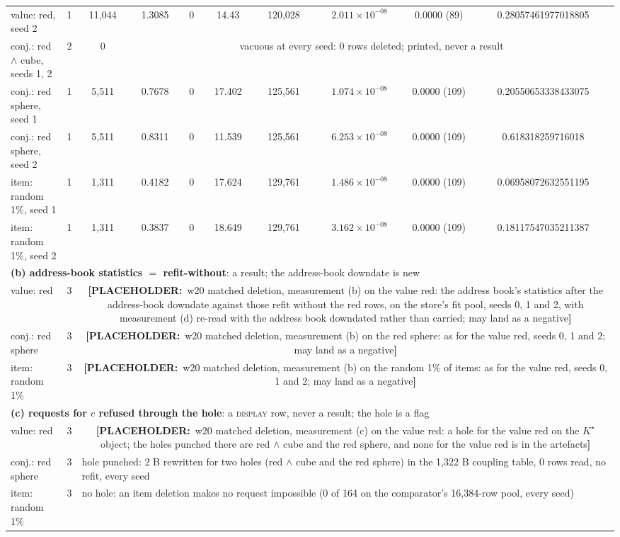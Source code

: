 \documentclass{article} %
\newcommand{\PLACEHOLDER}[1]{{\color{red}\textbf{[PLACEHOLDER:}~#1\textbf{]}}}
\newcommand{\sci}[2]{\ensuremath{#1\times10^{#2}}}
\newcommand{\Kstar}{\ensuremath{K^{\star}}}
\begin{document}
\begin{table}[t]
\begin{adjustbox}{max width=\linewidth}
\begin{tabular}{lccccccccc}
value: red, seed 2 & 1 & 11,044 & 1.3085 & 0 & 14.43 & 120,028 & \sci{2.011}{-08} & 0.0000 (89) & 0.28057461977018805 \\
conj.: red $\wedge$ cube, seeds 1, 2 & 2 & 0 & \multicolumn{7}{c}{vacuous at every seed: 0 rows deleted; printed, never a result} \\
conj.: red sphere, seed 1 & 1 & 5,511 & 0.7678 & 0 & 17.402 & 125,561 & \sci{1.074}{-08} & 0.0000 (109) & 0.20550653338433075 \\
conj.: red sphere, seed 2 & 1 & 5,511 & 0.8311 & 0 & 11.539 & 125,561 & \sci{6.253}{-08} & 0.0000 (109) & 0.618318259716018 \\
item: random 1\%, seed 1 & 1 & 1,311 & 0.4182 & 0 & 17.624 & 129,761 & \sci{1.486}{-08} & 0.0000 (109) & 0.06958072632551195 \\
item: random 1\%, seed 2 & 1 & 1,311 & 0.3837 & 0 & 18.649 & 129,761 & \sci{3.162}{-08} & 0.0000 (109) & 0.18117547035211387 \\
\midrule
\multicolumn{10}{l}{\textbf{(b) address-book statistics $=$ refit-without}: a result; the address-book downdate is new} \\
value: red & 3 & \multicolumn{8}{p{12cm}}{\PLACEHOLDER{w20 matched deletion, measurement (b) on the value red: the address book's statistics after the address-book downdate against those refit without the red rows, on the store's fit pool, seeds 0, 1 and 2, with measurement (d) re-read with the address book downdated rather than carried; may land as a negative}} \\
conj.: red sphere & 3 & \multicolumn{8}{p{12cm}}{\PLACEHOLDER{w20 matched deletion, measurement (b) on the red sphere: as for the value red, seeds 0, 1 and 2; may land as a negative}} \\
item: random 1\% & 3 & \multicolumn{8}{p{12cm}}{\PLACEHOLDER{w20 matched deletion, measurement (b) on the random 1\% of items: as for the value red, seeds 0, 1 and 2; may land as a negative}} \\
\midrule
\multicolumn{10}{l}{\textbf{(c) requests for $c$ refused through the hole}: a \textsc{display} row, never a result; the hole is a flag} \\
value: red & 3 & \multicolumn{8}{p{12cm}}{\PLACEHOLDER{w20 matched deletion, measurement (c) on the value red: a hole for the value red on the $\Kstar$ object; the holes punched there are red $\wedge$ cube and the red sphere, and none for the value red is in the artefacts}} \\
conj.: red sphere & 3 & \multicolumn{8}{l}{hole punched: 2 B rewritten for two holes (red $\wedge$ cube and the red sphere) in the 1,322 B coupling table, 0 rows read, no refit, every seed} \\ %
item: random 1\% & 3 & \multicolumn{8}{l}{no hole: an item deletion makes no request impossible (0 of 164 on the comparator's 16,384-row pool, every seed)} \\ %
\bottomrule
\end{tabular}\end{adjustbox}
\end{table}
\end{document}
